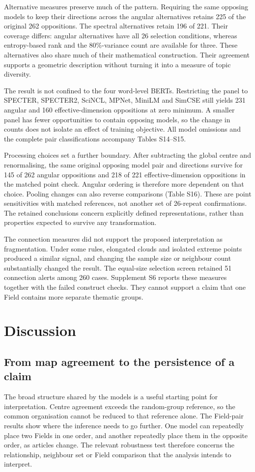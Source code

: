 \documentclass[12pt]{article}
\begin{document}
Alternative measures preserve much of the pattern. Requiring the same opposing models to keep their directions across the angular alternatives retains 225 of the original 262 oppositions. The spectral alternatives retain 196 of 221. Their coverage differs: angular alternatives have all 26 selection conditions, whereas entropy-based rank and the 80\%-variance count are available for three. These alternatives also share much of their mathematical construction. Their agreement supports a geometric description without turning it into a measure of topic diversity.

The result is not confined to the four word-level BERTs. Restricting the panel to SPECTER, SPECTER2, SciNCL, MPNet, MiniLM and SimCSE still yields 231 angular and 160 effective-dimension oppositions at zero minimum. A smaller panel has fewer opportunities to contain opposing models, so the change in counts does not isolate an effect of training objective. All model omissions and the complete pair classifications accompany Tables S14--S15.

Processing choices set a further boundary. After subtracting the global centre and renormalising, the same original opposing model pair and directions survive for 145 of 262 angular oppositions and 218 of 221 effective-dimension oppositions in the matched point check. Angular ordering is therefore more dependent on that choice. Pooling changes can also reverse comparisons (Table S16). These are point sensitivities with matched references, not another set of 26-repeat confirmations. The retained conclusions concern explicitly defined representations, rather than properties expected to survive any transformation.

The connection measures did not support the proposed interpretation as fragmentation. Under some rules, elongated clouds and isolated extreme points produced a similar signal, and changing the sample size or neighbour count substantially changed the result. The equal-size selection screen retained 51 connection alerts among 260 cases. Supplement S6 reports these measures together with the failed construct checks. They cannot support a claim that one Field contains more separate thematic groups.

\section{Discussion}
\subsection{From map agreement to the persistence of a claim}
The broad structure shared by the models is a useful starting point for interpretation. Centre agreement exceeds the random-group reference, so the common organisation cannot be reduced to that reference alone. The Field-pair results show where the inference needs to go further. One model can repeatedly place two Fields in one order, and another repeatedly place them in the opposite order, as articles change. The relevant robustness test therefore concerns the relationship, neighbour set or Field comparison that the analysis intends to interpret.
\end{document}
